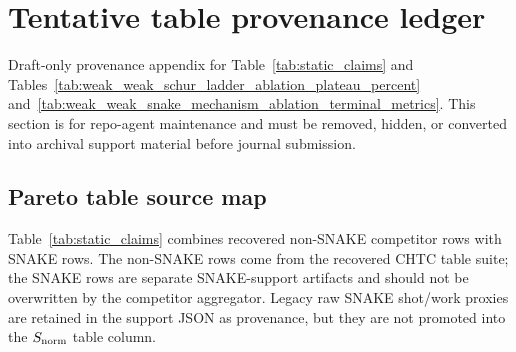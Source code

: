\documentclass[
  reprint,
  amsmath,
  amssymb,
  aps,
  pra,
  nofootinbib,
  superscriptaddress,
  floatfix
]{revtex4-2}
\newcommand{\tentative}[1]{\textcolor{red!70!black}{#1}}
\begin{document}
\section{Tentative table provenance ledger}
\label{app:data_ledger}

\tentative{Draft-only provenance appendix for Table~\ref{tab:static_claims} and Tables~\ref{tab:weak_weak_schur_ladder_ablation_plateau_percent} and~\ref{tab:weak_weak_snake_mechanism_ablation_terminal_metrics}. This section is for repo-agent maintenance and must be removed, hidden, or converted into archival support material before journal submission.}

\subsection{Pareto table source map}
\label{app:table_i_source_map}

Table~\ref{tab:static_claims} combines recovered non-SNAKE competitor rows with SNAKE rows. The non-SNAKE rows come from the recovered CHTC table suite; the SNAKE rows are separate SNAKE-support artifacts and should not be overwritten by the competitor aggregator. Legacy raw SNAKE shot/work proxies are retained in the support JSON as provenance, but they are not promoted into the $S_{\rm norm}$ table column.
\end{document}
